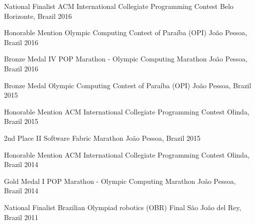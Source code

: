 


\begin{cvhonors}

  \cvhonor
    {National Finalist} %
    {ACM International Collegiate Programming Contest} %
    {Belo Horizonte, Brazil} %
    {2016} %

  \cvhonor
    {Honorable Mention} %
    {Olympic Computing Contest of Paraíba (OPI)} %
    {João Pessoa, Brazil} %
    {2016} %

  \cvhonor
    {Bronze Medal} %
    {IV POP Marathon - Olympic Computing Marathon} %
    {João Pessoa, Brazil} %
    {2016} %

  \cvhonor
    {Bronze Medal} %
    {Olympic Computing Contest of Paraíba (OPI)} %
    {João Pessoa, Brazil} %
    {2015} %

  \cvhonor
    {Honorable Mention} %
    {ACM International Collegiate Programming Contest} %
    {Olinda, Brazil} %
    {2015} %
    
  \cvhonor
    {2nd Place} %
    {II Software Fabric Marathon} %
    {João Pessoa, Brazil} %
    {2015} %

  \cvhonor
    {Honorable Mention} %
    {ACM International Collegiate Programming Contest} %
    {Olinda, Brazil} %
    {2014} %

  \cvhonor
    {Gold Medal} %
    {I POP Marathon - Olympic Computing Marathon} %
    {João Pessoa, Brazil} %
    {2014} %


  \cvhonor
    {National Finalist} %
    {Brazilian Olympiad robotics (OBR) Final} %
    {São João del Rey, Brazil} %
    {2011} %


\end{cvhonors}
